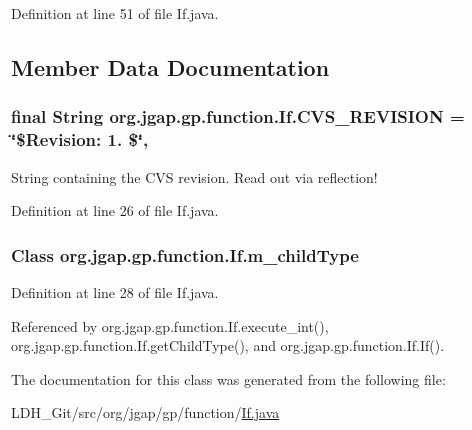 Definition at line 51 of file If.\-java.



\subsection{Member Data Documentation}
\hypertarget{classorg_1_1jgap_1_1gp_1_1function_1_1_if_aff0a6ff35b86931b107747c51f0b748f}{
\subsubsection[{C\-V\-S\-\_\-\-R\-E\-V\-I\-S\-I\-O\-N}]{\setlength{\rightskip}{0pt plus 5cm}final String org.\-jgap.\-gp.\-function.\-If.\-C\-V\-S\-\_\-\-R\-E\-V\-I\-S\-I\-O\-N = \char`\"{}\$Revision\-: 1. \$\char`\"{}\hspace{0.3cm}{\ttfamily [static]}, {\ttfamily [private]}}}\label{classorg_1_1jgap_1_1gp_1_1function_1_1_if_aff0a6ff35b86931b107747c51f0b748f}
String containing the C\-V\-S revision. Read out via reflection! 

Definition at line 26 of file If.\-java.

\hypertarget{classorg_1_1jgap_1_1gp_1_1function_1_1_if_a47fdc0575e3c352910e491a54cb4c50c}{
\subsubsection[{m\-\_\-child\-Type}]{\setlength{\rightskip}{0pt plus 5cm}Class org.\-jgap.\-gp.\-function.\-If.\-m\-\_\-child\-Type\hspace{0.3cm}{\ttfamily [private]}}}\label{classorg_1_1jgap_1_1gp_1_1function_1_1_if_a47fdc0575e3c352910e491a54cb4c50c}


Definition at line 28 of file If.\-java.



Referenced by org.\-jgap.\-gp.\-function.\-If.\-execute\-\_\-int(), org.\-jgap.\-gp.\-function.\-If.\-get\-Child\-Type(), and org.\-jgap.\-gp.\-function.\-If.\-If().



The documentation for this class was generated from the following file\-:\begin{DoxyCompactItemize}
\item 
L\-D\-H\-\_\-\-Git/src/org/jgap/gp/function/\hyperlink{_if_8java}{If.\-java}\end{DoxyCompactItemize}

